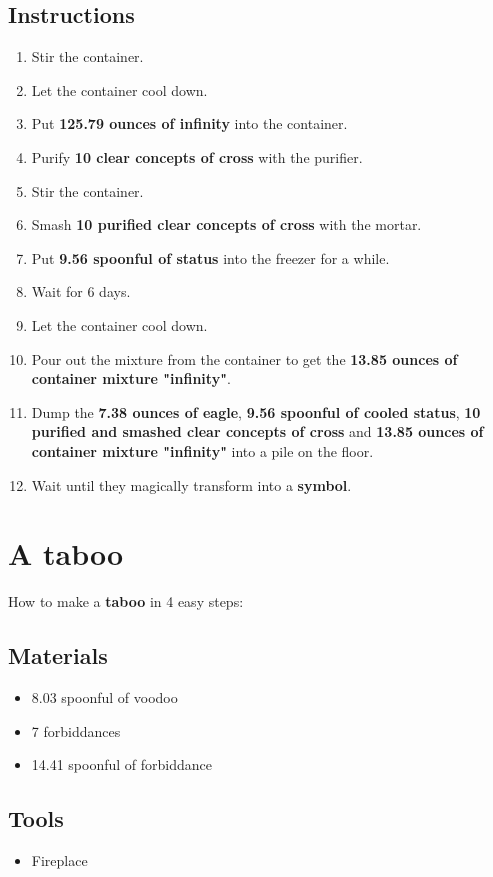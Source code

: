\documentclass{article}
\begin{document}
\subsection{Instructions}\begin{enumerate}
\item 
Stir the container.
\item 
Let the container cool down.
\item 
Put \textbf{125.79 ounces of infinity} into the container.
\item 
Purify \textbf{10 clear concepts of cross} with the purifier.
\item 
Stir the container.
\item 
Smash \textbf{10 purified clear concepts of cross} with the mortar.
\item 
Put \textbf{9.56 spoonful of status} into the freezer for a while.
\item 
Wait for 6 days.
\item 
Let the container cool down.
\item 
Pour out the mixture from the container to get the \textbf{13.85 ounces of container mixture "infinity"}.
\item 
Dump the \textbf{7.38 ounces of eagle}, \textbf{9.56 spoonful of cooled status}, \textbf{10 purified and smashed clear concepts of cross} and \textbf{13.85 ounces of container mixture "infinity"} into a pile on the floor.
\item 
Wait until they magically transform into a \textbf{symbol}.
\end{enumerate}
\newpage
\section{A taboo}How to make a \textbf{taboo} in 4 easy steps:

\subsection{Materials}\begin{itemize}
\item 
8.03 spoonful of voodoo
\item 
7 forbiddances
\item 
14.41 spoonful of forbiddance
\end{itemize}
\subsection{Tools}\begin{itemize}
\item 
Fireplace
\end{itemize}
\end{document}
